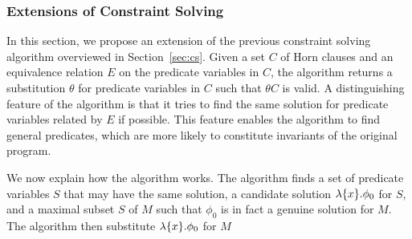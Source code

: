 \subsubsection{Extensions of Constraint Solving}
\label{sec:extcs}

In this section, we propose an extension of the previous constraint 
solving algorithm overviewed in Section~\ref{sec:cs}.  Given a set \(C\) 
of Horn clauses and an equivalence relation \(E\) on the predicate 
variables in \(C\), the algorithm returns a substitution \(\theta\) for 
predicate variables in \(C\) such that \(\theta C\) is valid.  A 
distinguishing feature of the algorithm is that it tries to find the 
same solution for predicate variables related by \(E\) if possible.  
This feature enables the algorithm to find general predicates, which are 
more likely to constitute invariants of the original program.


We now explain how the algorithm works.
The algorithm finds a set of predicate variables \(S\) that may have the 
same solution, a candidate solution \(\lambda \{{x}\}.\phi_0\) for \(S\), 
and a maximal subset \(S\) of \(M\) such that \(\phi_0\) is in fact a 
genuine solution for \(M\).  The algorithm then substitute \(\lambda 
\{{x}\}.\phi_0\) for \(M\)
\todo{}

